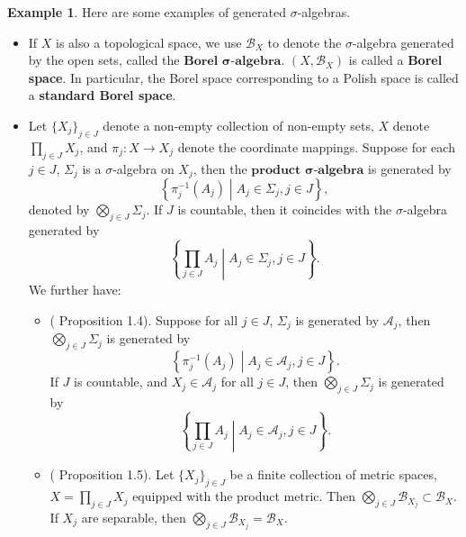 \documentclass[openany]{book}
\theoremstyle{definition}
\newtheorem{example}{Example}[chapter]
\theoremstyle{remark}
\begin{document}
\begin{example}
    Here are some examples of generated $\sigma$-algebras.
    \begin{itemize}
        \item If $X$ is also a topological space, we use $\mathcal{B}_X$ to denote the $\sigma$-algebra generated by the open sets, called the $\textbf{Borel }\boldsymbol{\sigma}\textbf{-algebra}$. $(X,\mathcal{B}_X)$ is called a \textbf{Borel space}. In particular, the Borel space corresponding to a Polish space is called a \textbf{standard Borel space}.

        \item Let $\{X_j\}_{j\in J}$ denote a non-empty collection of non-empty sets, $X$ denote $\prod_{j\in J}X_j$, and $\pi_j:X\to X_j$ denote the coordinate mappings. Suppose for each $j\in J$, $\Sigma_j$ is a $\sigma$-algebra on $X_j$, then the $\textbf{product }\boldsymbol{\sigma}\textbf{-algebra}$ is generated by
        \begin{equation*}
            \left\{\pi_j^{-1}(A_j)\middle|A_j\in\Sigma_j,j\in J\right\},
        \end{equation*}
        denoted by $\bigotimes_{j\in J}\Sigma_j$. If $J$ is countable, then it coincides with the $\sigma$-algebra generated by
        \begin{equation*}
            \left\{\prod_{j\in J}A_j\middle|A_j\in\Sigma_j,j\in J\right\}.
        \end{equation*}
        We further have:
        \begin{itemize}
            \item (\cite{F13} Proposition 1.4). Suppose for all $j\in J$, $\Sigma_j$ is generated by $\mathcal{A}_j$, then $\bigotimes_{j\in J}\Sigma_j$ is generated by
            \begin{equation*}
                \left\{\pi_j^{-1}(A_j)\middle|A_j\in \mathcal{A}_j,j\in J\right\}.
            \end{equation*}
            If $J$ is countable, and $X_j\in \mathcal{A}_j$ for all $j\in J$, then $\bigotimes_{j\in J}\Sigma_j$ is generated by
            \begin{equation*}
                \left\{\prod_{j\in J}A_j\middle|A_j\in \mathcal{A}_j,j\in J\right\}.
            \end{equation*}

            \item (\cite{F13} Proposition 1.5). Let $\{X_j\}_{j\in J}$ be a finite collection of metric spaces, $X=\prod_{j\in J}X_j$ equipped with the product metric. Then $\bigotimes_{j\in J}\mathcal{B}_{X_j}\subset \mathcal{B}_X$. If $X_j$ are separable, then $\bigotimes_{j\in J}\mathcal{B}_{X_j}=\mathcal{B}_X$.
        \end{itemize}
    \end{itemize}
\end{example}
\end{document}
